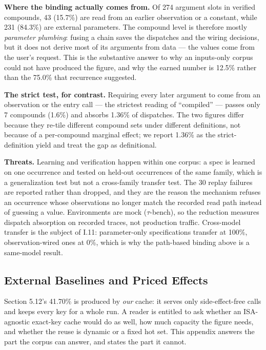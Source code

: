 \documentclass[
  11pt,
]{article}
\begin{document}
\textbf{Where the binding actually comes from.} Of 274 argument slots in
verified compounds, 43 (15.7\%) are read from an earlier observation or
a constant, while 231 (84.3\%) are external parameters. The compound
level is therefore mostly \emph{parameter plumbing}: fusing a chain
saves the dispatches and the wiring decisions, but it does not derive
most of its arguments from data --- the values come from the user's
request. This is the substantive answer to why an inputs-only corpus
could not have produced the figure, and why the earned number is 12.5\%
rather than the 75.0\% that recurrence suggested.

\textbf{The strict test, for contrast.} Requiring every later argument
to come from an observation or the entry call --- the strictest reading
of ``compiled'' --- passes only 7 compounds (1.6\%) and absorbs 1.36\%
of dispatches. The two figures differ because they re-tile different
compound sets under different definitions, not because of a per-compound
marginal effect; we report 1.36\% as the strict-definition yield and
treat the gap as definitional.

\textbf{Threats.} Learning and verification happen within one corpus: a
spec is learned on one occurrence and tested on held-out occurrences of
the same family, which is a generalization test but not a cross-family
transfer test. The 30 replay failures are reported rather than dropped,
and they are the reason the mechanism refuses an occurrence whose
observations no longer match the recorded read path instead of guessing
a value. Environments are mock (\(\tau\)-bench), so the reduction
measures dispatch absorption on recorded traces, not production traffic.
Cross-model transfer is the subject of I.11: parameter-only
specifications transfer at 100\%, observation-wired ones at 0\%, which
is why the path-based binding above is a same-model result.

\subsection{External Baselines and Priced
Effects}\label{external-baselines-and-priced-effects}

Section 5.12's 41.70\% is produced by \emph{our} cache: it serves only
side-effect-free calls and keeps every key for a whole run. A reader is
entitled to ask whether an ISA-agnostic exact-key cache would do as
well, how much capacity the figure needs, and whether the reuse is
dynamic or a fixed hot set. This appendix answers the part the corpus
can answer, and states the part it cannot.
\end{document}
